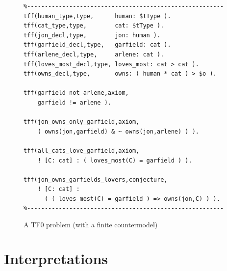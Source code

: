\documentclass[letterpaper]{article}
\begin{document}
\begin{figure}[htbp]
\scriptsize
{}
\begin{verbatim}
%--------------------------------------------------------
tff(human_type,type,      human: $tType ).
tff(cat_type,type,        cat: $tType ).
tff(jon_decl,type,        jon: human ).
tff(garfield_decl,type,   garfield: cat ).
tff(arlene_decl,type,     arlene: cat ).
tff(loves_most_decl,type, loves_most: cat > cat ).
tff(owns_decl,type,       owns: ( human * cat ) > $o ).

tff(garfield_not_arlene,axiom,
    garfield != arlene ).

tff(jon_owns_only_garfield,axiom,
    ( owns(jon,garfield) & ~ owns(jon,arlene) ) ).

tff(all_cats_love_garfield,axiom,
    ! [C: cat] : ( loves_most(C) = garfield ) ).

tff(jon_owns_garfields_lovers,conjecture,
    ! [C: cat] : 
      ( ( loves_most(C) = garfield ) => owns(jon,C) ) ).
%--------------------------------------------------------
\end{verbatim}
\caption{A TF0 problem (with a finite countermodel)
}
\label{TF0FiniteProblem}
\end{figure}

\section{Interpretations}
\label{Interpretations}
\end{document}
